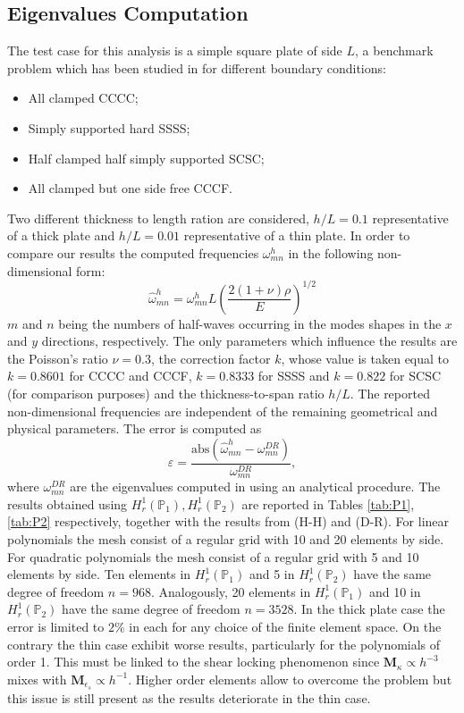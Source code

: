 \documentclass{ifacconf}
\begin{document}
\subsection{Eigenvalues Computation}
The test case for this analysis is a simple square plate of side $L$, a benchmark problem which has been studied in \cite{dawe1980rayleigh, huang1984nine, duran1999approximation} for different boundary conditions: 
\begin{itemize}
	\item All clamped CCCC; 
	\item Simply supported hard SSSS;
	\item Half clamped half simply supported SCSC;
	\item All clamped but one side free CCCF. 
\end{itemize}
Two different thickness to length ration are considered, $h/L=0.1$ representative of a thick plate and $h/L=0.01$ representative of a thin plate. 
In order to compare our results the computed frequencies $\omega_{mn}^h$ in the following non-dimensional form:
\begin{equation}
	\widehat{\omega}_{mn}^h = \omega_{mn}^h L \left(\frac{2 (1 + \nu) \rho}{E}\right)^{1/2}
\end{equation}
$m$ and $n$ being the numbers of half-waves occurring in the modes shapes in the $x$ and $y$ directions, respectively. The only parameters which influence the results are the Poisson's ratio $\nu=0.3$, the correction factor $k$, whose value is taken equal to $k = 0.8601$ for CCCC and CCCF, $k = 0.8333$ for SSSS and $k = 0.822$ for SCSC (for comparison purposes) and the thickness-to-span ratio $h/L$. The reported non-dimensional frequencies are independent of the remaining geometrical and physical parameters.  The error is computed as
\begin{equation}
	\varepsilon = \frac{\text{abs}(\widehat{\omega}_{mn}^h - \omega_{mn}^{DR})}{\omega_{mn}^{DR}},
\end{equation}
where $\omega_{mn}^{DR}$ are the eigenvalues computed in \cite{dawe1980rayleigh} using an analytical procedure. The results obtained using $H_r^1(\mathbb{P}_1), H_r^1(\mathbb{P}_2)$ are reported in Tables \ref{tab:P1}, \ref{tab:P2} respectively, together with the results from \cite{huang1984nine} (H-H) and \citealp{dawe1980rayleigh} (D-R). For linear polynomials the mesh consist of a regular grid with 10 and 20 elements by side. For quadratic polynomials the mesh consist of a regular grid with 5 and 10 elements by side. Ten elements in $H_r^1(\mathbb{P}_1)$ and 5 in $H_r^1(\mathbb{P}_2)$ have the same degree of freedom $n=968$. Analogously, 20 elements in $H_r^1(\mathbb{P}_1)$ and 10 in $H_r^1(\mathbb{P}_2)$ have the same degree of freedom $n=3528$.  In the thick plate case the error is limited to $2\%$ in each for any choice of the finite element space. On the contrary the thin case exhibit worse results, particularly for the polynomials of order 1. This must be linked to the shear locking phenomenon since $\bm{M}_{\kappa} \propto h^{-3}$ mixes with $\bm{M}_{\epsilon_s} \propto h^{-1}$. Higher order elements allow to overcome the problem but this issue is still present as the results deteriorate in the thin case.
 
\end{document}
